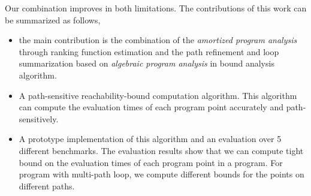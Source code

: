 Our combination improves in both limitations.
The contributions of this work can be summarized as follows,
 \begin{itemize}
   \item the main contribution is the combination of the \emph{amortized program analysis} through ranking function estimation and the path refinement and loop summarization based on \emph{algebraic program analysis} in bound analysis algorithm.
   \item A path-sensitive reachability-bound computation algorithm.
    This algorithm can compute the evaluation times of each program point accurately and path-sensitively.
   \item A prototype implementation of this algorithm and an evaluation over 5 different benchmarks.
    The evaluation results show that we can compute tight bound on the evaluation times of each program point in a program. For program with multi-path loop, we compute different bounds for the points on different paths.
 \end{itemize}